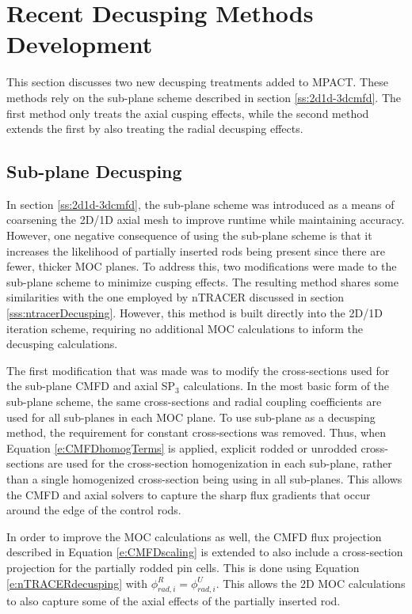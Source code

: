 \section{Recent Decusping Methods Development}

This section discusses two new decusping treatments added to MPACT.  These methods rely on the sub-plane scheme described in section \ref{ss:2d1d-3dcmfd}.  The first method only treats the axial cusping effects, while the second method extends the first by also treating the radial decusping effects.

\subsection{Sub-plane Decusping}

In section \ref{ss:2d1d-3dcmfd}, the sub-plane scheme was introduced as a means of coarsening the 2D/1D axial mesh to improve runtime while maintaining accuracy.  However, one negative consequence of using the sub-plane scheme is that it increases the likelihood of partially inserted rods being present since there are fewer, thicker MOC planes.  To address this, two modifications were made to the sub-plane scheme to minimize cusping effects.  The resulting method shares some similarities with the one employed by nTRACER discussed in section \ref{sss:ntracerDecusping}.  However, this method is built directly into the 2D/1D iteration scheme, requiring no additional MOC calculations to inform the decusping calculations.

The first modification that was made was to modify the cross-sections used for the sub-plane CMFD and axial SP$_3$ calculations.  In the most basic form of the sub-plane scheme, the same cross-sections and radial coupling coefficients are used for all sub-planes in each MOC plane.  To use sub-plane as a decusping method, the requirement for constant cross-sections was removed.  Thus, when Equation \ref{e:CMFDhomogTerms} is applied, explicit rodded or unrodded cross-sections are used for the cross-section homogenization in each sub-plane, rather than a single homogenized cross-section being using in all sub-planes.  This allows the CMFD and axial solvers to capture the sharp flux gradients that occur around the edge of the control rods.

In order to improve the MOC calculations as well, the CMFD flux projection described in Equation \ref{e:CMFDscaling} is extended to also include a cross-section projection for the partially rodded pin cells.  This is done using Equation \ref{e:nTRACERdecusping} with $\phi_{rad,i}^R = \phi_{rad,i}^U$.  This allows the 2D MOC calculations to also capture some of the axial effects of the partially inserted rod.

